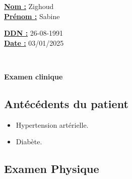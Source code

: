 \documentclass[12pt,a4paper]{article}%
\begin{document}
%
\normalsize%
\begin{minipage}{0.5\linewidth}%
\textbf{\underline{Nom :}} \hspace{1cm} Zighoud%
\\%
\textbf{\underline{Prénom :}} \hspace{1cm} Sabine%
\\%
\end{minipage}%
\begin{minipage}{0.5\linewidth}%
\textbf{\underline{DDN :}} \hspace{1cm} 26-08-1991%
\\%
\textbf{\underline{Date :}} \hspace{1cm} 03/01/2025%
\\%
\end{minipage}%
\hspace{\textwidth}%
\\%
\begin{center}%

        \begin{tcolorbox}[
            colframe=main_title_border_color,        %
            colback=main_title_background_color,        %
            coltitle=main_title_border_color,       %
            arc=8pt,              %
            boxrule=0.5mm,          %
            auto outer arc,       %
            width=\linewidth,     %
            halign=center         %
        ]
        \LARGE{\textbf{Examen clinique}}
        \end{tcolorbox}
\end{center}%
%
\vspace*{\baselineskip}%
\subsection*{Antécédents du patient}%
\label{subsec:Antcdentsdupatient}%

%
\begin{itemize}%
\setlength{\itemsep}{0pt}%
\item%
Hypertension artérielle.%
\item%
Diabète.%
\end{itemize}%
\subsection*{Examen Physique}%
\label{subsec:ExamenPhysique}%
\end{document}
